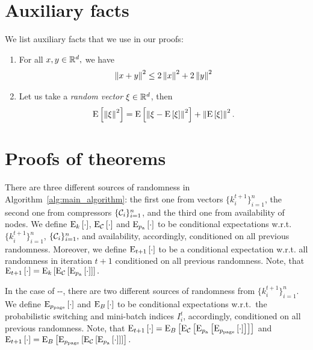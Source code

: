 \documentclass{article}
\begin{document}
\newpage
\appendix

\section{Auxiliary facts}
We list auxiliary facts that we use in our proofs:
\begin{enumerate}
    \item 
        For all $x, y \in \mathbb{R}^d,$ we have
        \begin{align}
            \left\| x + y \right\|^2 \leq 2\left\| x \right\|^2 + 2\left\| y \right\|^2
            \label{auxiliary:jensen_inequality}
        \end{align}
    \item
        Let us take a \textit{random vector} $\xi \in \mathbb{R}^d$, then
        \begin{align}
            {\rm E}\left[\left\| \xi \right\|^2\right] = {\rm E}\left[\left\| \xi - {\rm E}\left[\xi\right] \right\|^2\right] + \left\| {\rm E}\left[\xi\right] \right\|^2.
            \label{auxiliary:variance_decomposition}
        \end{align}
\end{enumerate}

\section{Proofs of theorems}

There are three different sources of randomness in Algorithm~\ref{alg:main_algorithm}: the first one from vectors $\{k_i^{t+1}\}_{i=1}^n$, the second one from compressors $\{\mathcal{C}_i\}_{i=1}^n$, and the third one from availability of nodes. We define ${\rm E}_{k}\left[\cdot\right]$, ${\rm E}_{\mathcal{C}}\left[\cdot\right]$ and ${\rm E}_{p_{\textnormal{a}}}\left[\cdot\right]$ to be conditional expectations w.r.t.\,$\{k_i^{t+1}\}_{i=1}^n$, $\{\mathcal{C}_i\}_{i=1}^n, $ and availability, accordingly, conditioned on all previous randomness. Moreover, we define ${\rm E}_{t+1}\left[\cdot\right]$ to be a conditional expectation w.r.t. all randomness in iteration $t+1$ conditioned on all previous randomness. Note, that ${\rm E}_{t+1}\left[\cdot\right] = {\rm E}_{k}\left[{\rm E}_{\mathcal{C}}\left[{\rm E}_{p_{\textnormal{a}}}\left[\cdot\right]\right]\right].$

In the case of --, there are two different sources of randomness from $\{k_i^{t+1}\}_{i=1}^n$. We define ${\rm E}_{p_{\text{page}}}\left[\cdot\right]$ and ${\rm E}_{B}\left[\cdot\right]$ to be conditional expectations w.r.t.\, the probabilistic switching and mini-batch indices $I_{i}^t$, accordingly, conditioned on all previous randomness. Note, that ${\rm E}_{t+1}\left[\cdot\right] = {\rm E}_{B}\left[{\rm E}_{\mathcal{C}}\left[{\rm E}_{p_{\textnormal{a}}}\left[{\rm E}_{p_{\text{page}}}\left[\cdot\right]\right]\right]\right]$ and ${\rm E}_{t+1}\left[\cdot\right] = {\rm E}_{B}\left[{\rm E}_{p_{\text{page}}}\left[{\rm E}_{\mathcal{C}}\left[{\rm E}_{p_{\textnormal{a}}}\left[\cdot\right]\right]\right]\right].$
\end{document}
